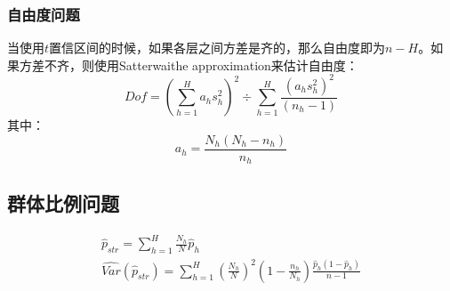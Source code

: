 \subsubsection{自由度问题}
当使用$t$置信区间的时候，如果各层之间方差是齐的，那么自由度即为$n-H$。如果方差不齐，则使用Satterwaithe approximation来估计自由度：
\begin{equation*}
	Dof=\left(\sum_{h=1}^Ha_hs_h^2\right)^2\div\sum_{h=1}^H\frac{(a_hs_h^2)^2}{(n_h-1)}
\end{equation*}
其中：
\begin{equation*}
	a_h=\frac{N_h(N_h-n_h)}{n_h}
\end{equation*}

\subsection{群体比例问题}
\begin{gather*}
	\hat{p}_{str}=\sum_{h=1}^H\frac{N_h}{N}\hat{p}_h \\
	\widehat{Var}(\hat{p}_{str})=\sum_{h=1}^H\left(\frac{N_h}{N}\right)^2\left(1-\frac{n_h}{N_h}\right)\frac{\hat{p}_h(1-\hat{p}_h)}{n-1}
\end{gather*}